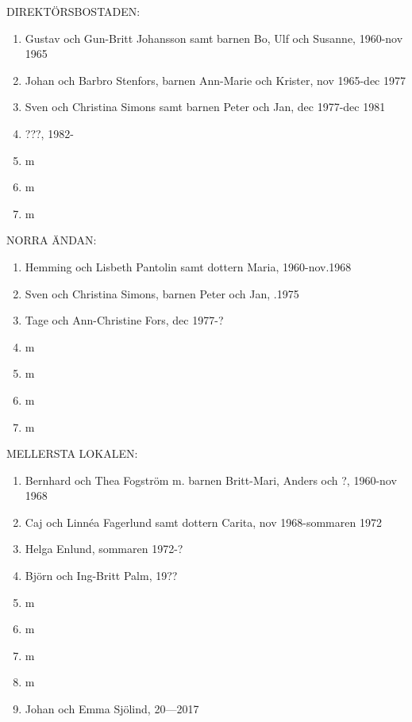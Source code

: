 DIREKTÖRSBOSTADEN:
\begin{enumerate}
  \item Gustav och Gun-Britt Johansson samt barnen Bo, Ulf och Susanne, 1960-nov 1965
  \item Johan och Barbro Stenfors, barnen Ann-Marie och Krister, nov 1965-dec 1977
  \item Sven och Christina Simons samt barnen Peter och Jan, dec 1977-dec 1981
  \item ???, 1982-
  \item m
  \item m
  \item m
\end{enumerate}
NORRA ÄNDAN:
\begin{enumerate}
  \item Hemming och Lisbeth Pantolin samt dottern Maria, 1960-nov.1968
  \item Sven och Christina Simons,  barnen Peter och Jan, .1975
  \item Tage och Ann-Christine Fors, dec 1977-?
  \item m
  \item m
  \item m
  \item m
\end{enumerate}
MELLERSTA LOKALEN:
\begin{enumerate}
  \item Bernhard och Thea Fogström m. barnen Britt-Mari, Anders och ?, 1960-nov 1968
  \item Caj och Linnéa Fagerlund samt dottern Carita, nov 1968-sommaren 1972
  \item Helga Enlund, sommaren 1972-?
  \item Björn och Ing-Britt Palm, 19??
  \item m
  \item m
  \item m
  \item m
  \item Johan och Emma Sjölind, 20---2017
\end{enumerate}










